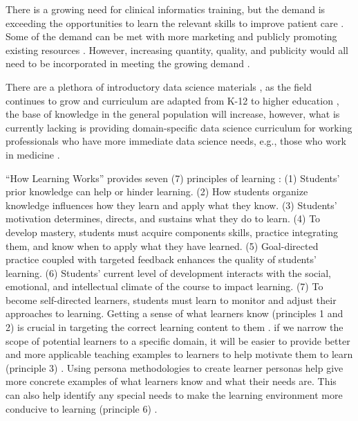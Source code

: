 \documentclass[030-workshop.tex]{subfiles}
\begin{document}
    There is a growing need for clinical informatics training,
    but the demand is exceeding the opportunities to learn the relevant skills to improve patient care
    \cite{americanmedicalassociationStudentInterestInformatics, banerjeeMedicalStudentAwareness2015}.
    Some of the demand can be met with more marketing and publicly promoting existing resources
    \cite{banerjeeMedicalStudentAwareness2015}.
    However, increasing quantity, quality, and publicity would all need to be incorporated
    in meeting the growing demand
    \cite{banerjeeMedicalStudentAwareness2015, payneBiomedicalInformaticsMeets2018}.

    There are a plethora of introductory data science materials
    \cite{krossDemocratizationDataScience2020},
    as the field continues to grow and curriculum are adapted from K-12 to higher education
    \cite{gaise2k12, gaise2016, ccdsc2021, csta2017},
    the base of knowledge in the general population will increase,
    however, what is currently lacking is providing domain-specific data science curriculum
    for working professionals who have more immediate data science needs, e.g., those who work in medicine
    \cite{krossDemocratizationDataScience2020, payneBiomedicalInformaticsMeets2018, dunnBuildingBiomedicalData2017, nationalinstitutesofhealthBigDataKnowledge2013, nationalinstitutesofhealthNIHStrategicPlan2020}.

    ``How Learning Works'' provides seven (7) principles of learning
    \cite{ambrose2010learning}:
    (1) Students' prior knowledge can help or hinder learning.
    (2) How students organize knowledge influences how they learn and apply what they know.
    (3) Students' motivation determines, directs, and sustains what they do to learn.
    (4) To develop mastery, students must acquire components skills, practice integrating them, and know when to apply what they have learned.
    (5) Goal-directed practice coupled with targeted feedback enhances the quality of students' learning.
    (6) Students' current level of development interacts with the social, emotional, and intellectual climate of the course to impact learning.
    (7) To become self-directed learners, students must learn to monitor and adjust their approaches to learning.
    Getting a sense of what learners know (principles 1 and 2) is crucial in targeting
    the correct learning content to them
    \cite{ambrose2010learning, Koch2016, wilson2019teaching}.
    if we narrow the scope of potential learners to a specific domain,
    it will be easier to provide better and more applicable teaching examples to learners
    to help motivate them to learn (principle 3)
    \cite{pruittPersonaLifecycleKeeping2006, schwartzParadoxChoiceWhy2016}.
    Using persona methodologies to create learner personas help give more concrete examples
    of what learners know and what their needs are.
    This can also help identify any special needs to make the learning environment more conducive to learning (principle 6)
    \cite{pruittPersonaLifecycleKeeping2006, schwartzParadoxChoiceWhy2016, RStudio2019}.
\end{document}
